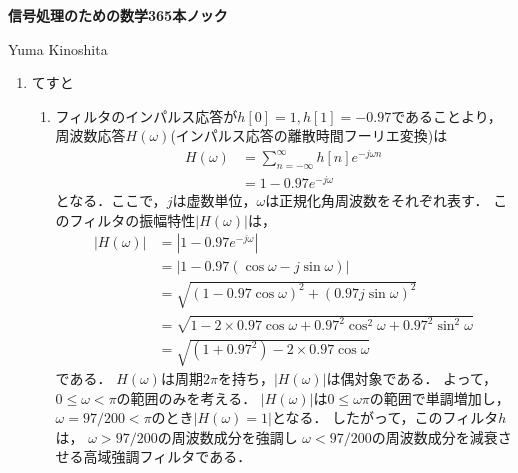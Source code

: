 \documentclass[10pt]{jsarticle}
\begin{document}
\begin{center}
  {\bf \Large 信号処理のための数学365本ノック}
\end{center}
\begin{flushright}
  Yuma Kinoshita
\end{flushright}
\setlength{\leftmarginii}{3pt}

\begin{enumerate}[label=問\arabic*.]
  \vspace{2mm}
  \item てすと
  \vspace{1mm}
  \begin{enumerate}[label=(\arabic*)]
    \item フィルタのインパルス応答が$h[0] = 1, h[1] = -0.97$であることより，
      周波数応答$H(\omega)$(インパルス応答の離散時間フーリエ変換)は
      \begin{align}
        H(\omega) &= \sum_{n = -\infty}^{\infty} h[n] e^{-j\omega n} \\
                  &= 1 - 0.97 e^{-j \omega}
      \end{align}
      となる．ここで，$j$は虚数単位，$\omega$は正規化角周波数をそれぞれ表す．
      このフィルタの振幅特性$|H(\omega)|$は，
      \begin{align}
        |H(\omega)| &= | 1 - 0.97 e^{-j \omega}| \\
                    &= | 1 - 0.97 (\cos \omega - j \sin \omega)| \\
                    &= \sqrt{(1 - 0.97 \cos \omega)^2 + (0.97 j \sin \omega)^2} \\
                    &= \sqrt{1 - 2 \times 0.97 \cos \omega + 0.97^2 \cos^2 \omega
                     + 0.97^2 \sin^2 \omega} \\
                    &= \sqrt{(1 + 0.97^2) - 2 \times 0.97 \cos \omega}
      \end{align}
      である．
      $H(\omega)$は周期$2\pi$を持ち，$|H(\omega)|$は偶対象である．
      よって，$0 \le \omega < \pi$の範囲のみを考える．
      $|H(\omega)|$は$0 \le \omega \pi$の範囲で単調増加し，
      $\omega = 97 / 200 < \pi$のとき$|H(\omega) = 1|$となる．
      したがって，このフィルタ$h$は，
      $\omega > 97 / 200$の周波数成分を強調し
      $\omega < 97 / 200$の周波数成分を減衰させる高域強調フィルタである．
  \end{enumerate}
  
\end{enumerate}
\end{document}

